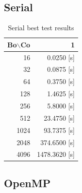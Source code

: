 \subsection{Serial}

    \begin{table}[h!]
        \centering
        \small
        \begin{tabular}{|r|r|}
            \hline
            Bo$\backslash$Co & 1 \\\hline
            16   &    0.0250 [s]  \\\hline
            32   &    0.0875 [s]  \\\hline
            64   &    0.3750 [s]  \\\hline
            128  &    1.4625 [s]  \\\hline
            256  &    5.8000 [s]  \\\hline
            512  &   23.4750 [s]  \\\hline
            1024 &   93.7375 [s]  \\\hline
            2048 &  374.6500 [s]  \\\hline
            4096 & 1478.3620 [s]  \\\hline
        \end{tabular}
        \caption{Serial best test results}
        \label{tab:serial}
    \end{table}

\subsection{OpenMP}

